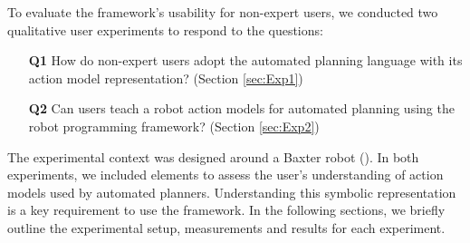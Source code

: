 
\label{sec:hypotheses}

To evaluate the framework's usability for non-expert users, %
we conducted two qualitative user experiments to respond to the questions:
\begin{enumerate}
  \item[\textbf{Q1}] How do non-expert users adopt the automated planning language with its action model representation? (Section \ref{sec:Exp1})
  \item[\textbf{Q2}] Can users teach a robot action models for automated planning using the robot programming framework? (Section \ref{sec:Exp2})
\end{enumerate}

The experimental context was designed around a Baxter robot ().
In both experiments, we included elements to assess the user's understanding of action models used by automated planners.
Understanding this symbolic representation is a key requirement to use the framework.
In the following sections, we briefly outline the experimental setup, measurements and results for each experiment.
 
